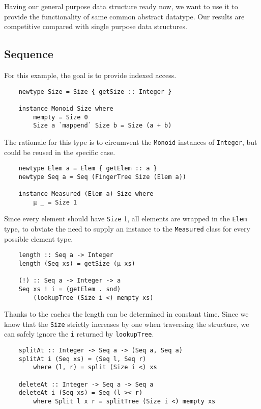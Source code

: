Having our general purpose data structure ready now, we want to use it to provide the functionality of same common abstract datatype. Our results are competitive compared with single purpose data structures.

\subsection{Sequence}
For this example, the goal is to provide indexed access. 
\begin{verbatim}
    newtype Size = Size { getSize :: Integer }

    instance Monoid Size where
        mempty = Size 0
        Size a `mappend` Size b = Size (a + b)
\end{verbatim}

The rationale for this type is to circumvent the \texttt{Monoid} instances of \texttt{Integer}, but could be reused in the specific case.

\begin{verbatim}
    newtype Elem a = Elem { getElem :: a }
    newtype Seq a = Seq (FingerTree Size (Elem a))
    
    instance Measured (Elem a) Size where
        μ _ = Size 1
\end{verbatim}

Since every element should have \texttt{Size} 1, all elements are wrapped in the \texttt{Elem} type, to obviate the need to supply an instance to the \texttt{Measured} class for every possible element type.

\begin{verbatim}
    length :: Seq a -> Integer
    length (Seq xs) = getSize (μ xs)

    (!) :: Seq a -> Integer -> a
    Seq xs ! i = (getElem . snd)
        (lookupTree (Size i <) mempty xs)
\end{verbatim}

Thanks to the caches the length can be determined in constant time. Since we know that the \texttt{Size} strictly increases by one when traversing the structure, we can safely ignore the \texttt{i} returned by \texttt{lookupTree}.

\begin{verbatim}
    splitAt :: Integer -> Seq a -> (Seq a, Seq a)
    splitAt i (Seq xs) = (Seq l, Seq r)
        where (l, r) = split (Size i <) xs

    deleteAt :: Integer -> Seq a -> Seq a
    deleteAt i (Seq xs) = Seq (l >< r)
        where Split l x r = splitTree (Size i <) mempty xs
\end{verbatim}

